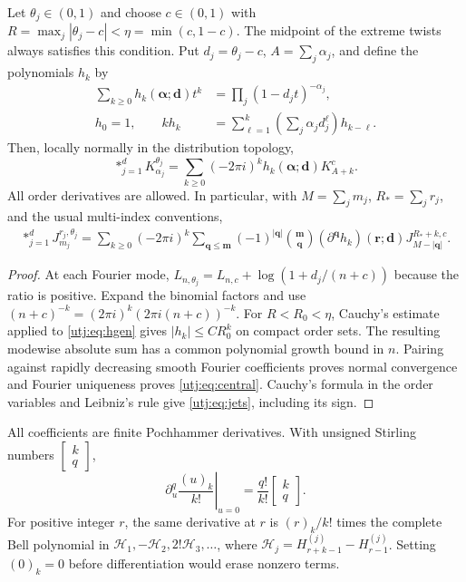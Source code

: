 \begin{theorem}
\label{utj:thm:central}
Let $\theta_j\in(0,1)$ and choose $c\in(0,1)$ with
$R=\max_j|\theta_j-c|<\eta=\min(c,1-c)$. The midpoint of the extreme
twists always satisfies this condition. Put $d_j=\theta_j-c$,
$A=\sum_j\alpha_j$, and define the polynomials $h_k$ by
\begin{align}
 \sum_{k\ge0}h_k(\boldsymbol\alpha;\boldsymbol d)t^k
   &=\prod_j(1-d_jt)^{-\alpha_j},\label{utj:eq:hgen}\\
 h_0=1,\qquad k h_k
   &=\sum_{\ell=1}^k\left(\sum_j\alpha_jd_j^\ell\right)h_{k-\ell}.
 \label{utj:eq:hrec}
\end{align}
Then, locally normally in the distribution topology,
\begin{equation}
 \mathop{*}_{j=1}^d K_{\alpha_j}^{\theta_j}
  =\sum_{k\ge0}(-2\pi i)^k h_k(\boldsymbol\alpha;\boldsymbol d)K_{A+k}^c.
 \label{utj:eq:central}
\end{equation}
All order derivatives are allowed. In particular, with
$M=\sum_jm_j$, $R_*=\sum_jr_j$, and the usual multi-index conventions,
\begin{align}
 \mathop{*}_{j=1}^d J_{m_j}^{r_j,\theta_j}
 =\sum_{k\ge0}(-2\pi i)^k\sum_{\boldsymbol q\le\boldsymbol m}
    (-1)^{|\boldsymbol q|}\binom{\boldsymbol m}{\boldsymbol q}
    (\partial^{\boldsymbol q}h_k)(\boldsymbol r;\boldsymbol d)
    J_{M-|\boldsymbol q|}^{R_*+k,c}.
 \label{utj:eq:jets}
\end{align}
\end{theorem}
\begin{proof}
At each Fourier mode,
$L_{n,\theta_j}=L_{n,c}+\log(1+d_j/(n+c))$ because the ratio is
positive. Expand the binomial factors and use
$(n+c)^{-k}=(2\pi i)^k(2\pi i(n+c))^{-k}$.
For $R<R_0<\eta$, Cauchy's estimate applied to
\eqref{utj:eq:hgen} gives $|h_k|\le C R_0^k$ on compact order sets.
The resulting modewise absolute sum has a common polynomial growth
bound in $n$. Pairing against rapidly decreasing smooth Fourier
coefficients proves normal convergence and Fourier uniqueness proves
\eqref{utj:eq:central}. Cauchy's formula in the order variables and
Leibniz's rule give \eqref{utj:eq:jets}, including its sign.
\end{proof}

All coefficients are finite Pochhammer derivatives. With unsigned
Stirling numbers $\left[\begin{smallmatrix}k\\q\end{smallmatrix}\right]$,
\[
 \left.\partial_u^q\frac{(u)_k}{k!}\right|_{u=0}
  =\frac{q!}{k!}\left[\begin{smallmatrix}k\\q\end{smallmatrix}\right].
\]
For positive integer $r$, the same derivative at $r$ is
$(r)_k/k!$ times the complete Bell polynomial in
$\mathcal H_1,-\mathcal H_2,2!\mathcal H_3,\ldots$, where
$\mathcal H_j=H_{r+k-1}^{(j)}-H_{r-1}^{(j)}$.
Setting $(0)_k=0$ before differentiation would erase nonzero terms.

